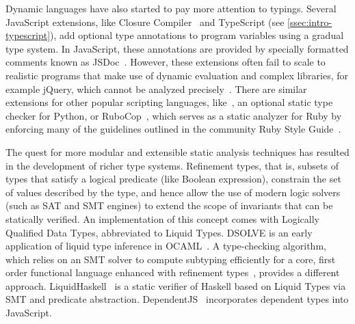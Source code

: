 \documentclass[sigplan,10pt,review,anonymous]{acmart} %
\theoremstyle{plain}
\theoremstyle{remark}
\theoremstyle{definition}
\begin{document}
Dynamic languages have also started to pay more attention to typings. Several
JavaScript extensions, like Closure Compiler~\citep{closure} and
TypeScript (see \cref{ssec:intro-typescript}), add optional type annotations to program
variables using a gradual type system.
%
In JavaScript, these annotations are
provided by specially formatted comments known as JSDoc~\citep{jsdoc}.
%
However, these
extensions often fail to scale to realistic programs that make use of dynamic
evaluation and complex libraries, for example jQuery, which cannot be analyzed
precisely~\cite{jensen2009}.
%
There are similar extensions for other popular scripting languages,
like~\citep{mypy}, an optional static type checker for Python,
or RuboCop~\citep{rubycop}, which serves as a static analyzer for Ruby by enforcing many of the guidelines
outlined in the community Ruby Style Guide~\citep{rubystyle}.

The quest for more modular and extensible static analysis techniques has
resulted in the development of richer type systems.
Refinement types, that is, subsets of types that satisfy a logical predicate (like Boolean expression),
constrain the set of values described by the type, and hence allow the use of
modern logic solvers (such as SAT and SMT engines) to extend the
scope of invariants that can be statically verified.
An implementation of this concept comes with Logically Qualified Data Types,
abbreviated to Liquid Types.
DSOLVE is an early application of liquid type inference in OCAML~\citep{liquid}.
A type-checking algorithm, which relies on an SMT solver
to compute subtyping efficiently for a core, first order functional language
enhanced with refinement types~\citep{semanticSMT}, provides a different
approach.
LiquidHaskell~\citep{refHaskell} is a static verifier of
Haskell based on Liquid Types via SMT and predicate
abstraction.
DependentJS~\citep{dependentJS} incorporates dependent types into JavaScript.

%

\end{document}
